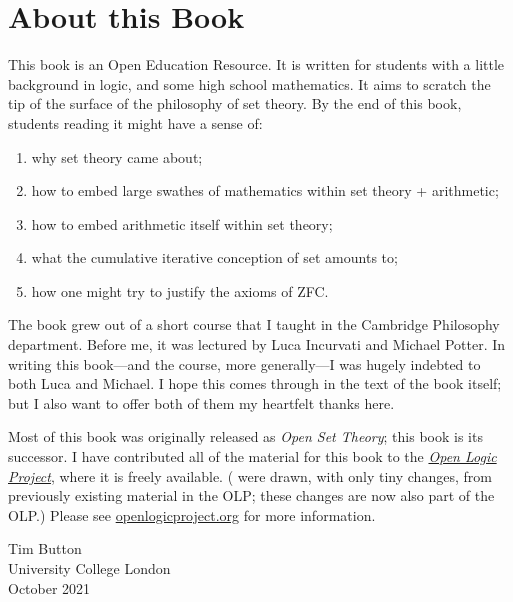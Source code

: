 \chapter{About this Book}

This book is an Open Education Resource. It is written for students
with a little background in logic, and some high school mathematics.
It aims to scratch the tip of the surface of the philosophy of set
theory. By the end of this book, students reading it might have a
sense of:
\begin{enumerate}
	\item why set theory came about; 
	\item how to embed large swathes of mathematics within set theory + arithmetic;
	\item how to embed arithmetic itself within set theory;
	\item what the cumulative iterative conception of set amounts to;
	\item how one might try to justify the axioms of ZFC.
\end{enumerate}
The book grew out of a short course that I taught in the Cambridge Philosophy department. Before me, it was lectured by Luca Incurvati and Michael
Potter. In writing this book---and the course, more generally---I was
hugely indebted to both Luca and Michael. I hope this comes through in the text of the book itself; but I also want to offer both of them
my heartfelt thanks here.

Most of this book was originally released as \emph{Open
Set Theory}; this book is its successor. I have contributed all of the material for this book to the \href{http://openlogicproject.org}{\emph{Open Logic Project}}, where it is freely available. ( were drawn, with only tiny
changes, from previously existing material in the OLP; these changes are now also part of the OLP.) Please see
\href{http://openlogicproject.org/}{openlogicproject.org} for more
information.

\begin{flushright}
Tim Button
\\University College London
\\October 2021
\end{flushright}
